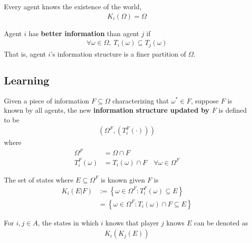 \documentclass{article}
\begin{document}
   	\begin{theorem}
   		Every agent knows the existence of the world,
   		\begin{align}
   			K_i(\Omega) = \Omega
   		\end{align}
   	\end{theorem}
   	
   	\begin{definition}
   		Agent $i$ has \textbf{better information} than agent $j$ if
   		\begin{align}
   			\forall \omega \in \Omega,\ T_i(\omega) \subseteq T_j(\omega)
   		\end{align}
   		That is, agent $i$'s information structure is a finer partition of $\Omega$.
   	\end{definition}
   	
   	\subsection{Learning}
   	\begin{definition}
   		Given a piece of information $F \subseteq \Omega$ characterizing that $\omega^* \in F$, suppose $F$ is known by all agents,
   		the new \textbf{information structure updated by $F$} is defined to be
   		\begin{align}
   			(\Omega^F, (T^F_i(\cdot)))
   		\end{align}
   		where
   		\begin{align}
   			\Omega^F &= \Omega \cap F \\
   			T_i^F(\omega) &= T_i(\omega) \cap F\quad \forall \omega \in \Omega^F
   		\end{align}
   	\end{definition}
   	\begin{definition}
   		The set of states where $E \subseteq \Omega^F$ is known given $F$ is 
   		\begin{align}
   			K_i(E|F) &:= \left\{
   			\omega \in \Omega^F: T_i^F(\omega) \subseteq E
   			\right\} \\
   			&= \left\{
   			\omega \in \Omega^F: T_i(\omega) \cap F \subseteq E
   			\right\}
   		\end{align}
   	\end{definition}
   	
   	\begin{notation}
   		For $i, j \in A$, the states in which $i$ knows that player $j$ knows $E$ can be denoted as
   		\begin{align}
   			K_i(K_j(E))
   		\end{align}
   	\end{notation}
   	
\end{document}
